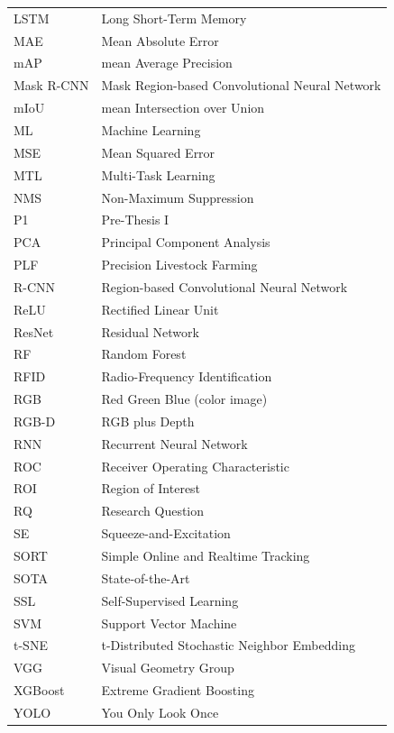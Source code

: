 \begin{longtable}{l>{\raggedright\arraybackslash}p{11cm}}
LSTM & Long Short-Term Memory \\
MAE & Mean Absolute Error \\
mAP & mean Average Precision \\
Mask R-CNN & Mask Region-based Convolutional Neural Network \\
mIoU & mean Intersection over Union \\
ML & Machine Learning \\
MSE & Mean Squared Error \\
MTL & Multi-Task Learning \\
NMS & Non-Maximum Suppression \\
P1 & Pre-Thesis I \\
PCA & Principal Component Analysis \\
PLF & Precision Livestock Farming \\
R-CNN & Region-based Convolutional Neural Network \\
ReLU & Rectified Linear Unit \\
ResNet & Residual Network \\
RF & Random Forest \\
RFID & Radio-Frequency Identification \\
RGB & Red Green Blue (color image) \\
RGB-D & RGB plus Depth \\
RNN & Recurrent Neural Network \\
ROC & Receiver Operating Characteristic \\
ROI & Region of Interest \\
RQ & Research Question \\
SE & Squeeze-and-Excitation \\
SORT & Simple Online and Realtime Tracking \\
SOTA & State-of-the-Art \\
SSL & Self-Supervised Learning \\
SVM & Support Vector Machine \\
t-SNE & t-Distributed Stochastic Neighbor Embedding \\
VGG & Visual Geometry Group \\
XGBoost & Extreme Gradient Boosting \\
YOLO & You Only Look Once \\
\end{longtable}


\pagebreak